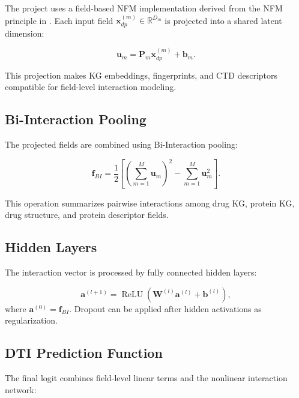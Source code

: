 The project uses a field-based NFM implementation derived from the NFM
principle in \cite{he2017neural}. Each input field
$\mathbf{x}_{dp}^{(m)}\in\mathbb{R}^{D_m}$ is projected into a shared latent
dimension:

\begin{equation}
    \mathbf{u}_{m}
    =
    \mathbf{P}_{m}\mathbf{x}_{dp}^{(m)}+\mathbf{b}_{m}.
    \label{eq:nfm_field_projection}
\end{equation}

This projection makes KG embeddings, fingerprints, and CTD descriptors
compatible for field-level interaction modeling.

\subsection{Bi-Interaction Pooling}

The projected fields are combined using Bi-Interaction pooling:

\begin{equation}
    \mathbf{f}_{BI}
    =
    \frac{1}{2}
    \left[
        \left(
            \sum_{m=1}^{M}\mathbf{u}_{m}
        \right)^2
        -
        \sum_{m=1}^{M}\mathbf{u}_{m}^{2}
    \right].
    \label{eq:nfm_bi_interaction}
\end{equation}

This operation summarizes pairwise interactions among drug KG, protein KG,
drug structure, and protein descriptor fields.

\subsection{Hidden Layers}

The interaction vector is processed by fully connected hidden layers:

\begin{equation}
    \mathbf{a}^{(l+1)}
    =
    \operatorname{ReLU}
    \left(
        \mathbf{W}^{(l)}\mathbf{a}^{(l)}+\mathbf{b}^{(l)}
    \right),
\end{equation}
where $\mathbf{a}^{(0)}=\mathbf{f}_{BI}$. Dropout can be applied after hidden
activations as regularization.

\subsection{DTI Prediction Function}

The final logit combines field-level linear terms and the nonlinear interaction
network:

